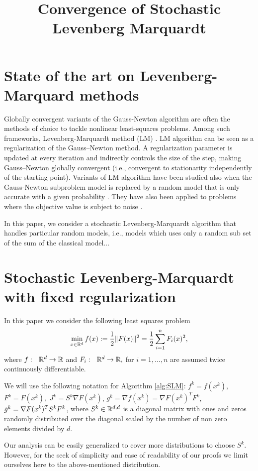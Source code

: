 \documentclass{article}
\title{Convergence of Stochastic Levenberg Marquardt}
\begin{document}
\maketitle

\section{State of the art on Levenberg-Marquard methods}


Globally convergent variants of the Gauss-Newton algorithm are often the methods of choice to tackle nonlinear least-squares problems. Among such frameworks, Levenberg-Marquardt method (LM) \cite{KLevenberg_1944, DMarquardt_1963, EBergou_YDiouane_VKungurtsev_2020}. LM algorithm  can be seen as a regularization of the Gauss–Newton method.  A regularization parameter is updated at every iteration and indirectly controls the size of the step, making Gauss–Newton globally convergent (i.e., convergent to stationarity independently of the starting point). Variants of LM algorithm have been  studied also when the Gauss-Newton subproblem model is replaced by a random model that is 
only accurate with a given probability \cite{EBergou_SGratton_LNVicente_2016, EBergou_YDiouane_VKungurtsev_CWRoyer_2018}. They have also been applied to problems where the 
objective value is subject to noise \cite{JJMore_1977, SBellavia_SGratton_ERiccietti_2018}. 

In this paper, we consider a stochastic Levenberg-Marquardt algorithm 
that handles particular random models, i.e., models which uses only a random sub set of the sum of the classical model... 

\section{Stochastic Levenberg-Marquardt with fixed regularization}

In this paper we consider the following least squares problem
\begin{equation}
    \min_{x\in \mathbb{R}^d} f(x) := \frac{1}{2} \| F(x)\|^2 = \frac{1}{2} \sum_{i=1}^n F_i(x)^2,
\end{equation}
where $f:~~ \mathbb{R}^{d} \to \mathbb{R} $ and $F_i:~~ \mathbb{R}^{d} \to \mathbb{R}, $ for $i=1,\ldots,n$ are assumed twice continuously differentiable.

We will use the following notation for Algorithm \ref{alg:SLM}: 
$f^k = f(x^k)$, $F^k = F(x^k),$ $J^k = S^k\nabla F(x^k)$, $g^k= \nabla f(x^k) = \nabla F(x^k)^T F^k$, $\Tilde{g}^k = \nabla F(x^k)^T S^k F^k$, where $S^k \in \mathbb{R}^{d,d}$ is a diagonal matrix with ones and zeros randomly distributed over the diagonal scaled by the number of non zero elements divided by $d$.
\begin{remark}
Our analysis can be easily generalized to cover more distributions to choose $S^k$. However, for the seek of simplicity and ease of readability of our proofs we limit ourselves here to the above-mentioned distribution. 
\end{remark}
\end{document}
